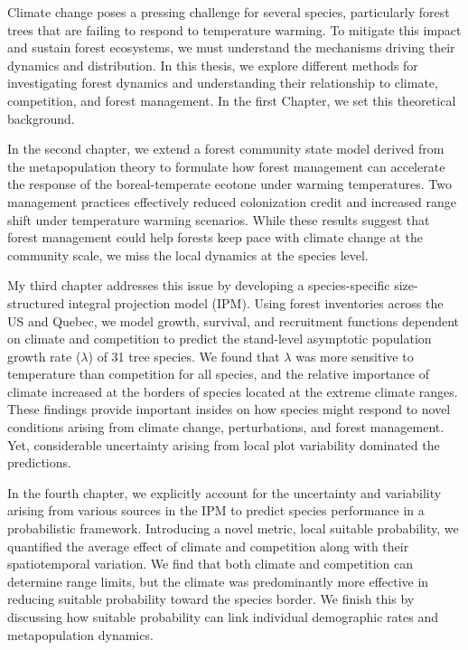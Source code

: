 Climate change poses a pressing challenge for several species, particularly forest trees that are failing to respond to temperature warming. To mitigate this impact and sustain forest ecosystems, we must understand the mechanisms driving their dynamics and distribution. In this thesis, we explore different methods for investigating forest dynamics and understanding their relationship to climate, competition, and forest management. In the first Chapter, we set this theoretical background.

In the second chapter, we extend a forest community state model derived from the metapopulation theory to formulate how forest management can accelerate the response of the boreal-temperate ecotone under warming temperatures. Two management practices effectively reduced colonization credit and increased range shift under temperature warming scenarios. While these results suggest that forest management could help forests keep pace with climate change at the community scale, we miss the local dynamics at the species level.

My third chapter addresses this issue by developing a species-specific size-structured integral projection model (IPM). Using forest inventories across the US and Quebec, we model growth, survival, and recruitment functions dependent on climate and competition to predict the stand-level asymptotic population growth rate ($\lambda$) of 31 tree species. We found that $\lambda$ was more sensitive to temperature than competition for all species, and the relative importance of climate increased at the borders of species located at the extreme climate ranges. These findings provide important insides on how species might respond to novel conditions arising from climate change, perturbations, and forest management. Yet, considerable uncertainty arising from local plot variability dominated the predictions.

In the fourth chapter, we explicitly account for the uncertainty and variability arising from various sources in the IPM to predict species performance in a probabilistic framework. Introducing a novel metric, local suitable probability, we quantified the average effect of climate and competition along with their spatiotemporal variation. We find that both climate and competition can determine range limits, but the climate was predominantly more effective in reducing suitable probability toward the species border. We finish this by discussing how suitable probability can link individual demographic rates and metapopulation dynamics.

